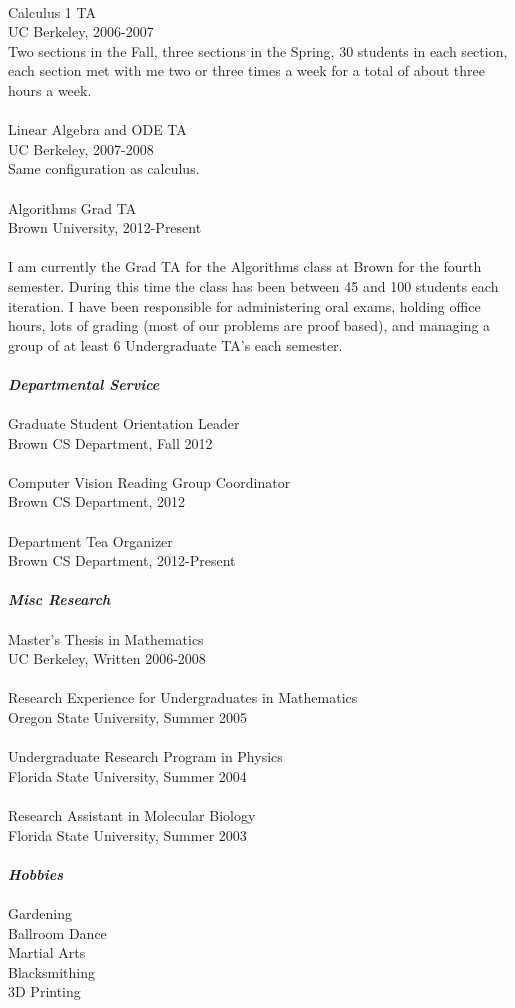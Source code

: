 \documentclass[12pt]{article}
\numberwithin{equation}{section}
\numberwithin{table}{section}
\numberwithin{figure}{section}
\begin{document}
\\
Calculus 1 TA\\
UC Berkeley, 2006-2007\\
Two sections in the Fall, three sections in the Spring, 30 students in each section, each section met with me
two or three times a week for a total of about three hours a week.\\
 \\
Linear Algebra and ODE TA\\
UC Berkeley, 2007-2008\\
Same configuration as calculus.\\
 \\
Algorithms Grad TA\\
Brown University, 2012-Present\\
\\
I am currently the Grad TA for the Algorithms class at Brown for the fourth semester. During this time the class has been
between 45 and 100 students each iteration.  I have been responsible for administering oral exams, holding office hours,
lots of grading (most of our problems are proof based), and managing a group of at least 6 Undergraduate TA's each semester.\\
 \\
\textbf{\emph{Departmental Service}}\\
 \\
Graduate Student Orientation Leader\\
Brown CS Department, Fall 2012\\
 \\
Computer Vision Reading Group Coordinator\\
Brown CS Department, 2012\\
 \\
Department Tea Organizer\\
Brown CS Department, 2012-Present\\
 \\
\textbf{\emph{Misc Research}}\\
 \\
Master's Thesis in Mathematics\\
UC Berkeley, Written 2006-2008\\
 \\
Research Experience for Undergraduates in Mathematics\\
Oregon State University, Summer 2005\\
 \\
Undergraduate Research Program in Physics\\
Florida State University, Summer 2004\\
 \\
Research Assistant in Molecular Biology\\
Florida State University, Summer 2003\\
 \\
\textbf{\emph{Hobbies}}\\
 \\
Gardening\\
Ballroom Dance\\
Martial Arts\\
Blacksmithing\\
3D Printing\\
 \\
\end{document}
